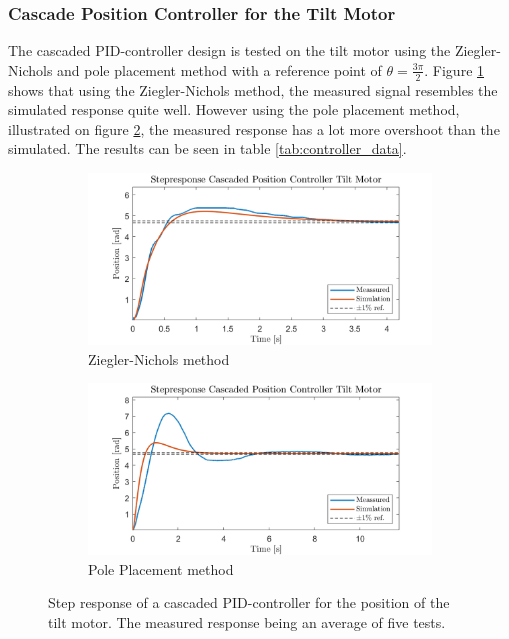 \documentclass[../../main.tex]{subfiles}
\begin{document}
\subsubsection*{Cascade Position Controller for the Tilt Motor}
The cascaded PID-controller design is tested on the tilt motor using the Ziegler-Nichols and pole placement method with a reference point of $\theta = \frac{3\pi}{2}$. Figure \ref{fig:Cascade_ZN_tilt} shows that using the Ziegler-Nichols method, the measured signal resembles the simulated response quite well. However using the pole placement method, illustrated on figure \ref{fig:cascade_model_tilt}, the measured response has a lot more overshoot than the simulated. The results can be seen in table \ref{tab:controller_data}.

\begin{figure}[h]
     \centering
     \begin{subfigure}[b]{0.49\textwidth}
         \centering
         \includegraphics[width=\textwidth]{Sections/Test/Images/cascade_ZN_tilt.png}
         \caption{Ziegler-Nichols method}
         \label{fig:Cascade_ZN_tilt}
     \end{subfigure}
     \hfill
     \begin{subfigure}[b]{0.49\textwidth}
         \centering
         \includegraphics[width=\textwidth]{Sections/Test/Images/cascade_Model_tilt.png}
         \caption{Pole Placement method}
         \label{fig:cascade_model_tilt}
     \end{subfigure}
        \caption{Step response of a cascaded PID-controller for the position of the tilt motor. The measured response being an average of five tests.}
        \label{fig:CascadeTilt}
\end{figure}
\end{document}
